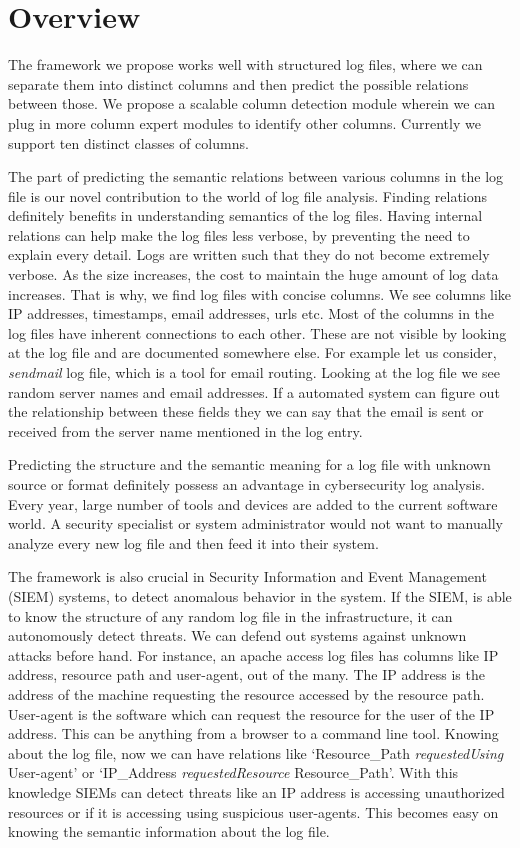 \chapter{Overview}
\thispagestyle{plain}
\label{Overview}

The framework we propose works well with structured log files, where we can separate them into distinct columns and then predict the possible relations between those. We propose a scalable column detection module wherein we can plug in more column expert modules to identify other columns. Currently we support ten distinct classes of columns.

The part of predicting the semantic relations between various columns in the log file is our novel contribution to the world of log file analysis. Finding relations definitely benefits in understanding semantics of the log files. Having internal relations can help make the log files less verbose, by preventing the need to explain every detail. Logs are written such that they do not become extremely verbose. As the size increases, the cost to maintain the huge amount of log data increases. That is why, we find log files with concise columns. We see columns like IP addresses, timestamps, email addresses, urls etc. Most of the columns in the log files have inherent connections to each other. These are not visible by looking at the log file and are documented somewhere else. For example let us consider, \textit{sendmail} log file, which is a tool for email routing. Looking at the log file we see random server names and email addresses. If a automated system can figure out the relationship between these fields they we can say that the email is sent or received from the server name mentioned in the log entry.

Predicting the structure and the semantic meaning for a log file with unknown source or format definitely possess an advantage in cybersecurity log analysis. Every year, large number of tools and devices are added to the current software world. A security specialist or system administrator would not want to manually analyze every new log file and then feed it into their system. 

The framework is also crucial in Security Information and Event Management (SIEM) systems, to detect anomalous behavior in the system. If the SIEM, is able to know the structure of any random log file in the infrastructure, it can autonomously detect threats. We can defend out systems against unknown attacks before hand. For instance, an apache access log files has columns like IP address, resource path and user-agent, out of the many. The IP address is the address of the machine requesting the resource accessed by the resource path. User-agent is the software which can request the resource for the user of the IP address. This can be anything from a browser to a command line tool. Knowing about the log file, now we can have relations like `Resource\_Path \textit{requestedUsing} User-agent' or `IP\_Address \textit{requestedResource} Resource\_Path'. With this knowledge SIEMs can detect threats like an IP address is accessing unauthorized resources or if it is accessing using suspicious user-agents. This becomes easy on knowing the semantic information about the log file.

